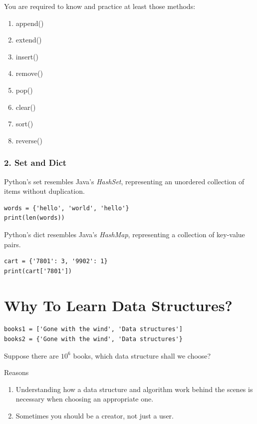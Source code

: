 \documentclass[aspectratio=169, 14pt]{beamer}
\begin{document}
\begin{frame}
You are required to know and practice at least those methods:
\begin{enumerate}
    \item append()
    \item extend()
    \item insert()
    \item remove()
    \item pop()
    \item clear()
    \item sort()
    \item reverse()
\end{enumerate}    

\end{frame}

\begin{frame}[fragile]
    \frametitle{2. Set and Dict}
Python's \alert{set} resembles Java's \emph{HashSet}, representing an unordered collection of items without duplication.
\begin{verbatim}
words = {'hello', 'world', 'hello'}
print(len(words))    
\end{verbatim}
\pause
Python's \alert{dict} resembles Java's \emph{HashMap}, representing a collection of key-value pairs.
\begin{verbatim}
cart = {'7801': 3, '9902': 1}
print(cart['7801'])    
\end{verbatim}
\end{frame}

\section{Why To Learn Data Structures?}

\begin{frame}[fragile]
\begin{verbatim}
books1 = ['Gone with the wind', 'Data structures']
books2 = {'Gone with the wind', 'Data structures'}
\end{verbatim}

Suppose there are $10^6$ books, which data structure shall we choose?

\pause

\begin{block}{Reasons}
    \begin{enumerate}
        \item Understanding how a data structure and algorithm work behind the scenes is necessary when choosing an appropriate one.
        \item Sometimes you should be a creator, not just a user.
    \end{enumerate}
\end{block}
\end{frame}
\end{document}
